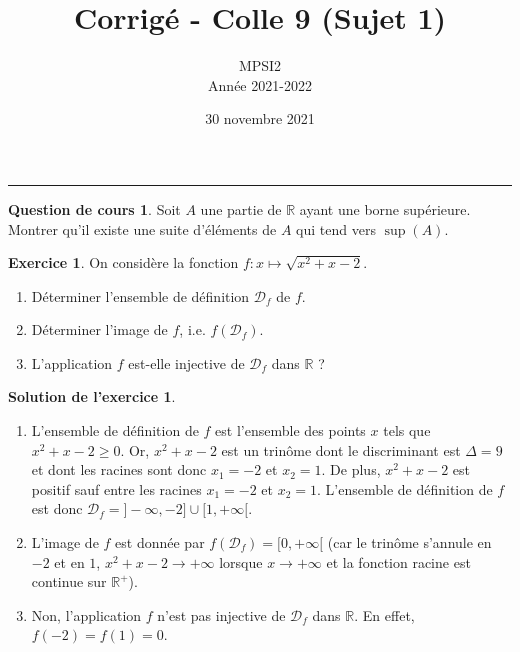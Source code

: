 \documentclass[a4paper, 11pt,openany]{article}%
\title{Corrigé - Colle 9 (Sujet 1)}
\author{MPSI2\\
Année 2021-2022}
\date{30 novembre 2021}
\theoremstyle{plain}
\theoremstyle{definition}
\newtheorem{cours}{Question de cours}
\newtheorem{exo}{Exercice}
\newtheorem{sol}{Solution de l'exercice}
\theoremstyle{remark}
\newcommand{\R}{\mathbb{R}}
\newcommand{\calD}{\mathcal{D}}
\begin{document}
   \maketitle
      \rule{\linewidth}{0.5mm}


\begin{cours}
Soit $A$ une partie de $\R$ ayant une borne supérieure. Montrer qu'il existe une suite d'éléments de $A$ qui tend vers $\sup(A)$.
\end{cours}

\begin{exo}
On considère la fonction 
$ f : x \mapsto \sqrt{x^2 + x - 2}$.
\begin{enumerate}
\item Déterminer l'ensemble de définition $\calD_f$ de $f$.
\item Déterminer l'image de $f$, i.e. $f(\calD_f)$.
\item L'application $f$ est-elle injective de $\calD_f$ dans $\R$ ?
\end{enumerate}
\end{exo}

\begin{sol}
\begin{enumerate}
\item L'ensemble de définition de $f$ est l'ensemble des points $x$ tels que $x^2 + x -2 \geqslant 0$. Or, $x^2 + x -2$ est un trinôme dont le discriminant est $\Delta = 9$ et dont les racines sont donc $x_1 = -2$ et $x_2 =1$. De plus, $x^2 +x -2$ est positif sauf entre les racines $x_1 = -2$ et $x_2= 1$. L'ensemble de définition de $f$ est donc $\calD_f = ]-\infty,-2] \cup [1, +\infty[$.
\item L'image de $f$ est donnée par $f(\calD_f) = [0,+\infty[$ (car le trinôme s'annule en $-2$ et en $1$, $x^2+x-2 \to + \infty$ lorsque $x \to + \infty$ et la fonction racine est continue sur $\R^+$).
\item Non, l'application $f$ n'est pas injective de $\calD_f$ dans $\R$. En effet, $f(-2) =  f(1)= 0$.
\end{enumerate}
\end{sol}
\end{document}
